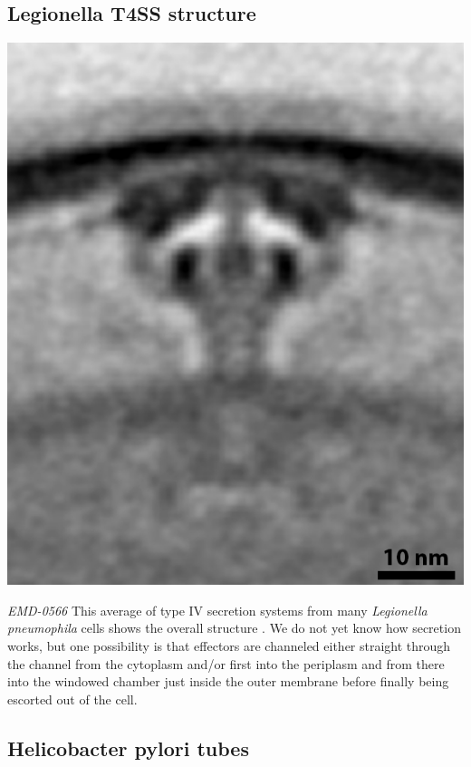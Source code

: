 \documentclass[]{tufte-book}
\begin{document}
\hypertarget{Legionella_T4SS_structure}{%
\subsection{Legionella T4SS structure}\label{Legionella_T4SS_structure}}

\includegraphics{img/schematics/9_3_2}

\emph{EMD-0566}
This average of type IV secretion systems from many \emph{Legionella pneumophila} cells shows the overall structure \citep{ghosal2019a}. We do not yet know how secretion works, but one possibility is that effectors are channeled either straight through the channel from the cytoplasm and/or first into the periplasm and from there into the windowed chamber just inside the outer membrane before finally being escorted out of the cell.

\hypertarget{Helicobacter_pylori_tubes}{%
\subsection{Helicobacter pylori tubes}\label{Helicobacter_pylori_tubes}}
\end{document}
